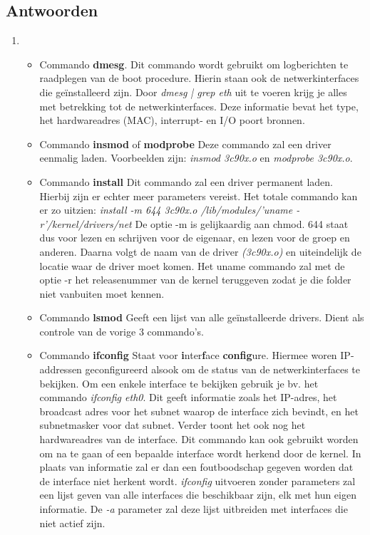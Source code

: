 \documentclass{report}
\begin{document}
\subsection{Antwoorden}
\begin{enumerate}
	\item %
	\begin{itemize}
		\item Commando \textbf{dmesg}. 
		\newline
		Dit commando wordt gebruikt om logberichten te raadplegen van de boot procedure. Hierin staan ook de netwerkinterfaces die geïnstalleerd zijn. Door \textit{dmesg | grep eth} uit te voeren krijg je alles met betrekking tot de netwerkinterfaces. Deze informatie bevat het type, het hardwareadres (MAC), interrupt- en I/O poort bronnen.
		\item Commando \textbf{insmod} of \textbf{modprobe} 
		\newline 
		Deze commando zal een driver eenmalig laden. Voorbeelden zijn: \textit{insmod 3c90x.o} en \textit{modprobe 3c90x.o}.
		\item Commando \textbf{install}
		\newline
		Dit commando zal een driver permanent laden. Hierbij zijn er echter meer parameters vereist. Het totale commando kan er zo uitzien: \textit{install -m 644 3c90x.o /lib/modules/'uname -r'/kernel/drivers/net} De optie -m is gelijkaardig aan chmod. 644 staat dus voor lezen en schrijven voor de eigenaar, en lezen voor de groep en anderen. Daarna volgt de naam van de driver \textit{(3c90x.o)} en uiteindelijk de locatie waar de driver moet komen. Het uname commando zal met de optie -r het releasenummer van de kernel teruggeven zodat je die folder niet vanbuiten moet kennen.
		\item Commando \textbf{lsmod}
		\newline
		Geeft een lijst van alle geïnstalleerde drivers. Dient als controle van de vorige 3 commando's.
		\item Commando \textbf{ifconfig}
		\newline
		Staat voor \textbf{i}nter\textbf{f}ace \textbf{config}ure. Hiermee woren IP-addressen geconfigureerd alsook om de status van de netwerkinterfaces te bekijken. Om een enkele interface te bekijken gebruik je bv. het commando \textit{ifconfig eth0}. Dit geeft informatie zoals het IP-adres, het broadcast adres voor het subnet waarop de interface zich bevindt, en het subnetmasker voor dat subnet. Verder toont het ook nog het hardwareadres van de interface. Dit commando kan ook gebruikt worden om na te gaan of een bepaalde interface wordt herkend door de kernel. In plaats van informatie zal er dan een foutboodschap gegeven worden dat de interface niet herkent wordt. \textit{ifconfig} uitvoeren zonder parameters zal een lijst geven van alle interfaces die beschikbaar zijn, elk met hun eigen informatie. De \textit{-a} parameter zal deze lijst uitbreiden met interfaces die niet actief zijn.	
		

\end{itemize}
\end{enumerate}
\end{document}
